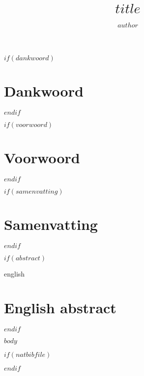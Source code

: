 \documentclass[9pt, twoside]{extreport}
\title{$title$}
\author{$author$}
\begin{document}
\maketitle
{}

$if(dankwoord)$
  \chapter*{Dankwoord}
  
$endif$

$if(voorwoord)$
  \chapter*{Voorwoord}
  
$endif$

$if(samenvatting)$
  \chapter*{Samenvatting}
  
$endif$

$if(abstract)$
  \begin{otherlanguage*}{english}
  \chapter*{English abstract}
  
  \end{otherlanguage*}
$endif$

\tableofcontents
{}

\newpage
{}

$body$

$if(natbibfile)$


$endif$
\end{document}
